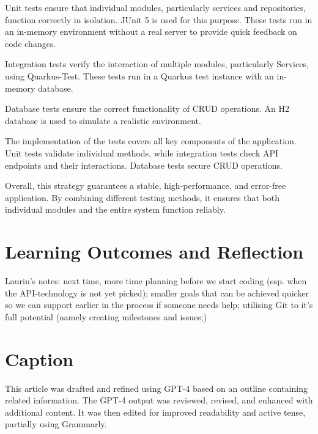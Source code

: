 \documentclass[a4paper, 11pt]{article}
\begin{document}
Unit tests ensure that individual modules, particularly services and repositories, function correctly in isolation. JUnit 5 is used for this purpose. These tests run in an in-memory environment without a real server to provide quick feedback on code changes.

Integration tests verify the interaction of multiple modules, particularly Services, using Quarkus-Test. These tests run in a Quarkus test instance with an in-memory database.

Database tests ensure the correct functionality of CRUD operations. An H2 database is used to simulate a realistic environment.

The implementation of the tests covers all key components of the application. Unit tests validate individual methods, while integration tests check API endpoints and their interactions. Database tests secure CRUD operations.

Overall, this strategy guarantees a stable, high-performance, and error-free application. By combining different testing methods, it ensures that both individual modules and the entire system function reliably.


    \section{Learning Outcomes and Reflection}\label{sec:learning-outcomes-and-reflection}
    Laurin's notes: next time, more time planning before we start coding (esp. when the API-technology is not yet picked); smaller goals that can be achieved quicker so we can support earlier in the process if someone needs help; utilising Git to it's full potential (namely creating milestones and issues;)



    \section*{Caption}
    This article was drafted and refined using GPT-4 based on an outline containing related information. The GPT-4 output was reviewed, revised, and enhanced with additional content. It was then edited for improved readability and active tense, partially using Grammarly.
\end{document}
